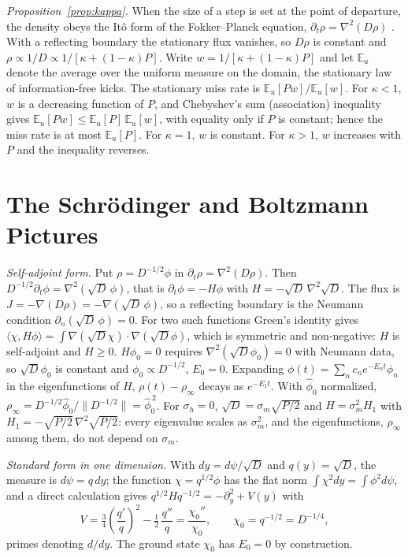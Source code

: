 \documentclass[12pt]{article}
\numberwithin{equation}{section}
\begin{document}
\emph{Proposition~\ref{prop:kappa}.} When the size of a step is set at the point of departure, the density obeys the It\^o form of the Fokker--Planck equation, $\partial_t\rho=\nabla^2(D\rho)$ \citep{Schnitzer1993}. With a reflecting boundary the stationary flux vanishes, so $D\rho$ is constant and $\rho\propto1/D\propto1/[\kappa+(1-\kappa)P]$. Write $w=1/[\kappa+(1-\kappa)P]$ and let $\mathbb{E}_u$ denote the average over the uniform measure on the domain, the stationary law of information-free kicks. The stationary miss rate is $\mathbb{E}_u[Pw]/\mathbb{E}_u[w]$. For $\kappa<1$, $w$ is a decreasing function of $P$, and Chebyshev's sum (association) inequality \citep{Chebyshev1882} gives $\mathbb{E}_u[Pw]\le\mathbb{E}_u[P]\,\mathbb{E}_u[w]$, with equality only if $P$ is constant; hence the miss rate is at most $\mathbb{E}_u[P]$. For $\kappa=1$, $w$ is constant. For $\kappa>1$, $w$ increases with $P$ and the inequality reverses.

\section{The Schr\"odinger and Boltzmann Pictures}\label{app:pictures}

\emph{Self-adjoint form.} Put $\rho=D^{-1/2}\phi$ in $\partial_t\rho=\nabla^2(D\rho)$. Then $D^{-1/2}\partial_t\phi=\nabla^2(\sqrt D\,\phi)$, that is $\partial_t\phi=-H\phi$ with $H=-\sqrt D\,\nabla^2\sqrt D$. The flux is $J=-\nabla(D\rho)=-\nabla(\sqrt D\,\phi)$, so a reflecting boundary is the Neumann condition $\partial_n(\sqrt D\,\phi)=0$. For two such functions Green's identity gives $\langle\chi,H\phi\rangle=\int\nabla(\sqrt D\chi)\cdot\nabla(\sqrt D\phi)$, which is symmetric and non-negative: $H$ is self-adjoint and $H\ge0$. $H\phi_0=0$ requires $\nabla^2(\sqrt D\phi_0)=0$ with Neumann data, so $\sqrt D\phi_0$ is constant and $\phi_0\propto D^{-1/2}$, $E_0=0$. Expanding $\phi(t)=\sum_nc_ne^{-E_nt}\phi_n$ in the eigenfunctions of $H$, $\rho(t)-\rho_\infty$ decays as $e^{-E_1t}$. With $\hat\phi_0$ normalized, $\rho_\infty=D^{-1/2}\hat\phi_0/\|D^{-1/2}\|=\hat\phi_0^{\,2}$. For $\sigma_h=0$, $\sqrt D=\sigma_m\sqrt{P/2}$ and $H=\sigma_m^2H_1$ with $H_1=-\sqrt{P/2}\,\nabla^2\sqrt{P/2}$: every eigenvalue scales as $\sigma_m^2$, and the eigenfunctions, $\rho_\infty$ among them, do not depend on $\sigma_m$.

\emph{Standard form in one dimension.} With $dy=d\psi/\sqrt D$ and $q(y)=\sqrt{D}$, the measure is $d\psi=q\,dy$; the function $\chi=q^{1/2}\phi$ has the flat norm $\int\chi^2dy=\int\phi^2d\psi$, and a direct calculation gives $q^{1/2}Hq^{-1/2}=-\partial_y^2+V(y)$ with
\begin{equation}
V=\tfrac34\left(\frac{q'}{q}\right)^2-\tfrac12\,\frac{q''}{q}=\frac{\chi_0''}{\chi_0},\qquad\chi_0=q^{-1/2}=D^{-1/4},
\end{equation}
primes denoting $d/dy$. The ground state $\chi_0$ has $E_0=0$ by construction.
\end{document}
